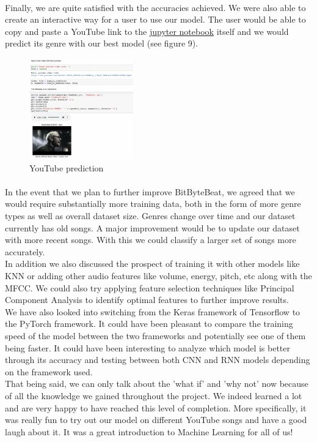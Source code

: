 \paragraph{}
Finally, we are quite satisfied with the accuracies achieved. We were also able to create an interactive way for a user to use our model. The user would be able to copy and paste a YouTube link to the \href{https://github.com/xkaDachi/COMP432_Music_Classification/blob/main/Music%20Classification.ipynb}{jupyter notebook} itself and we would predict its genre with our best model (see figure 9).
\begin{figure}[H]
        \centering
        \includegraphics[width=0.4\textwidth]{images/yt_pred.png} 
        \caption{YouTube prediction}
    \end{figure}
\paragraph{}
In the event that we plan to further improve BitByteBeat, we agreed that we would require substantially more training data, both in the form of more genre types as well as overall dataset size. Genres change over time and our dataset currently has old songs. A major improvement would be to update our dataset with more recent songs. 
With this we could classify a larger set of songs more accurately.\\ 

In addition we also discussed the prospect of training it with other models like KNN or adding other audio features like volume, energy, pitch, etc along with the MFCC. We could also try applying feature selection techniques like Principal Component Analysis to identify optimal features to further improve results.\\

We have also looked into switching from the Keras framework of Tensorflow to the PyTorch framework. It could have been pleasant to compare the training speed of the model between the two frameworks and potentially see one of them being faster. It could have been interesting to analyze which model is better through its accuracy and testing between both CNN and RNN models depending on the framework used. \\

That being said, we can only talk about the 'what if' and 'why not' now because of all the knowledge we gained throughout the project. We indeed learned a lot and are very happy to have reached this level of completion. More specifically, it was really fun to try out our model on different YouTube songs and have a good laugh about it. It was a great introduction to Machine Learning for all of us!
